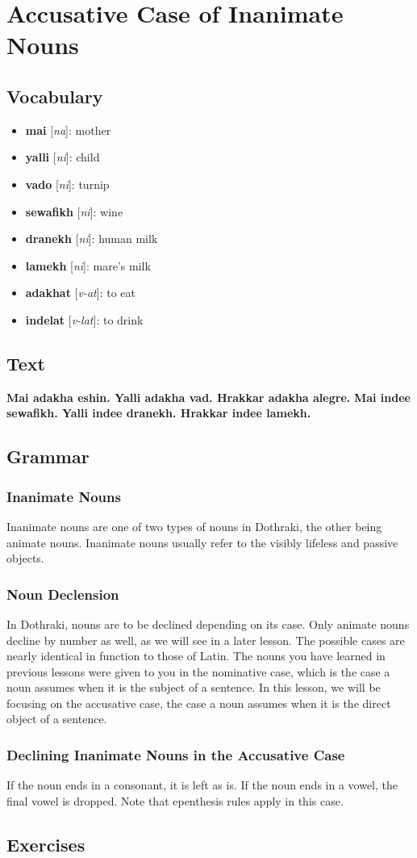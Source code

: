 \chapter{Accusative Case of Inanimate Nouns}
\section*{Vocabulary}
\begin{itemize}
	\item \textbf{mai} [\textit{na}]: mother
	\item \textbf{yalli} [\textit{ni}]: child
	\item \textbf{vado} [\textit{ni}]: turnip
	\item \textbf{sewafikh} [\textit{ni}]: wine
	\item \textbf{dranekh} [\textit{ni}]: human milk
	\item \textbf{lamekh} [\textit{ni}]: mare's milk
	\item \textbf{adakhat} [\textit{v-at}]: to eat
	\item \textbf{indelat} [\textit{v-lat}]: to drink
\end{itemize}
\section*{Text}
	\textbf{Mai adakha eshin. Yalli adakha vad. Hrakkar adakha alegre.}
	\textbf{Mai indee sewafikh. Yalli indee dranekh. Hrakkar indee lamekh.}
\section*{Grammar}
\subsection*{Inanimate Nouns}
	Inanimate nouns are one of two types of nouns in Dothraki, the other being
  animate nouns. Inanimate nouns usually refer to the visibly lifeless and
	passive objects.
\subsection*{Noun Declension}
	In Dothraki, nouns are to be declined depending on its case.
	Only animate nouns decline by number as well, as we will see in a later lesson.
	The possible cases are nearly identical in function to those of Latin. The
	nouns you have learned in previous lessons were given to you in the nominative
	case, which is the case a noun assumes when it is the subject of a sentence.
 	In this lesson, we will be focusing on the accusative case, the case a noun
 	assumes when it is the direct object of a sentence.
\subsection*{Declining Inanimate Nouns in the Accusative Case}
	If the noun ends in a consonant, it is left as is. If the noun ends in a vowel,
	the final vowel is dropped. Note that epenthesis rules apply in this case.
\section*{Exercises}
